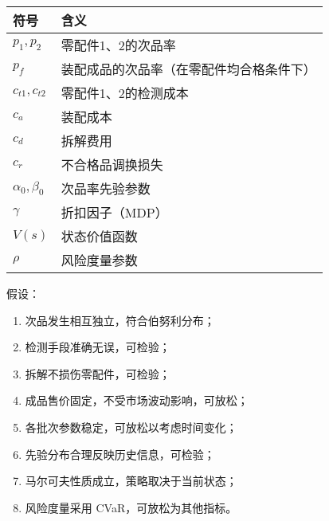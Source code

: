 \begin{table}[htbp]\centering
\begin{tabular}{ll}
\toprule
符号 & 含义 \\
\midrule
$ p_1, p_2 $ & 零配件1、2的次品率 \\
$ p_f $ & 装配成品的次品率（在零配件均合格条件下） \\
$ c_{t1}, c_{t2} $ & 零配件1、2的检测成本 \\
$ c_a $ & 装配成本 \\
$ c_d $ & 拆解费用 \\
$ c_r $ & 不合格品调换损失 \\
$ \alpha_0, \beta_0 $ & 次品率先验参数 \\
$ \gamma $ & 折扣因子（MDP） \\
$ V(s) $ & 状态价值函数 \\
$ \rho $ & 风险度量参数 \\
\bottomrule
\end{tabular}
\end{table}

假设：
\begin{enumerate}
  \item 次品发生相互独立，符合伯努利分布；
  \item 检测手段准确无误，可检验；
  \item 拆解不损伤零配件，可检验；
  \item 成品售价固定，不受市场波动影响，可放松；
  \item 各批次参数稳定，可放松以考虑时间变化；
  \item 先验分布合理反映历史信息，可检验；
  \item 马尔可夫性质成立，策略取决于当前状态；
  \item 风险度量采用 CVaR，可放松为其他指标。
\end{enumerate}
